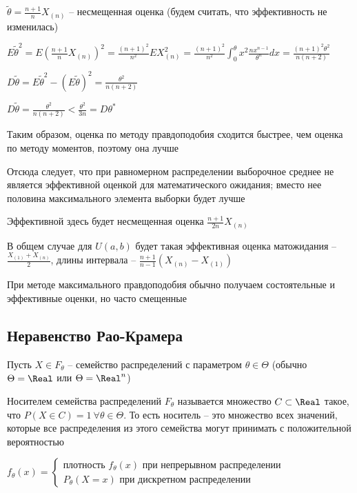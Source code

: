 $\tilde{\theta} = \frac{n + 1}{n} X_{(n)}$ -- несмещенная оценка (будем считать, что эффективность не изменилась)

$E\tilde{\theta}^2 = E(\frac{n + 1}{n} X_{(n)})^2 = \frac{(n + 1)^2}{n^2} E X_{(n)}^2 = \frac{(n + 1)^2}{n^2} \int_0^\theta x^2 \frac{n x^{n - 1}}{\theta^n} dx = 
\frac{(n + 1)^2 \theta^2}{n (n + 2)}$

$D\tilde{\theta} = E\tilde{\theta}^2 - (E\tilde{\theta})^2 = \frac{\theta^2}{n(n + 2)}$

$D\tilde{\theta} = \frac{\theta^2}{n(n + 2)} < \frac{\theta^2}{3n} = D\theta^*$

Таким образом, оценка по методу правдоподобия сходится быстрее, чем оценка по методу моментов, поэтому она лучше

Отсюда следует, что при равномерном распределении выборочное среднее не является эффективной оценкой
для математического ожидания; вместо нее половина максимального элемента выборки будет лучше

\Nota Эффективной здесь будет несмещенная оценка $\frac{n + 1}{2n} X_{(n)}$

В общем случае для $U(a, b)$ будет такая эффективная оценка матожидания -- $\frac{X_{(1)} + X_{(n)}}{2}$, длины интервала -- $\frac{n + 1}{n - 1} (X_{(n)} - X_{(1)})$

\Nota При методе максимального правдоподобия обычно получаем состоятельные и эффективные оценки, но часто смещенные

\subsection{Неравенство Рао-Крамера}

Пусть $X \in F_\theta$ -- семейство распределений с параметром $\theta \in \Theta$ (обычно $\Theta = \Real$ или $\Theta = \Real^n$)

\Def Носителем семейства распределений $F_\theta$ называется множество $C \subset \Real$
такое, что $P(X \in C) = 1 \ \forall \theta \in \Theta$. То есть носитель -- это множество всех значений, которые все распределения из этого семейства могут принимать с положительной вероятностью

$f_\theta(x) = \begin{cases}
    \text{плотность } f_\theta(x) \text{ при непрерывном распределении} \\
    P_\theta(X = x) \text{ при дискретном распределении}
\end{cases}$

\hypertarget{fishers_information}{}

